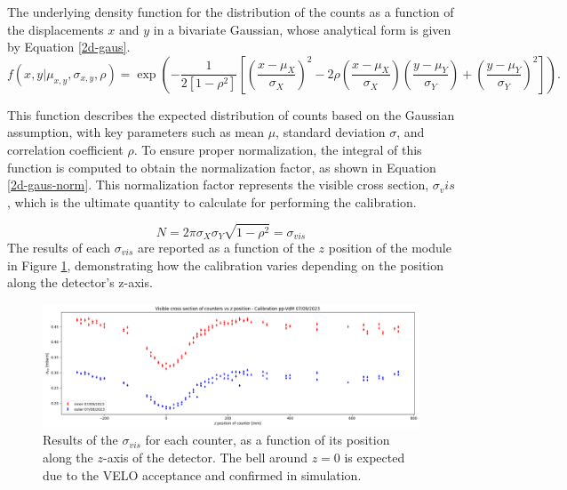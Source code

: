 The underlying density function for the distribution of the counts as a function of the displacements $x$ and $y$ in a bivariate Gaussian, whose analytical form is given by Equation \eqref{2d-gaus}. 
\begin{equation}
    f(x,y|\mu_{x,y},\sigma_{x,y},\rho)=\exp{\left(-{\frac {1}{2\left[1-\rho ^{2}\right]}}\left[\left({\frac {x-\mu _{X}}{\sigma _{X}}}\right)^{2}-2\rho \left({\frac {x-\mu _{X}}{\sigma _{X}}}\right)\left({\frac {y-\mu _{Y}}{\sigma _{Y}}}\right)+\left({\frac {y-\mu _{Y}}{\sigma _{Y}}}\right)^{2}\right]\right)}\label{2d-gaus}.
\end{equation}

This function describes the expected distribution of counts based on the Gaussian assumption, with key parameters such as mean $\mu$, standard deviation $\sigma$, and correlation coefficient $\rho$. To ensure proper normalization, the integral of this function is computed to obtain the normalization factor, as shown in Equation \eqref{2d-gaus-norm}. This normalization factor represents the visible cross section, $\sigma_vis$, which is the ultimate quantity to calculate for performing the calibration.

\begin{equation}
    N = 2\pi \sigma_{X}\sigma_{Y}\sqrt {1-\rho ^{2}}=\sigma_{vis}\label{2d-gaus-norm}
\end{equation}
 The results of each $\sigma_{vis}$ are reported as a function of the $z$ position of the module in Figure \ref{fig:coefficient_pos}, demonstrating how the calibration varies depending on the position along the detector's z-axis.

\begin{figure}
    \centering
    \includegraphics[width=\textwidth]{figures/coefficient_pos.png}
    \caption{Results of the $\sigma_{vis}$ for each counter, as a function of its position along the $z$-axis of the detector. The bell around $z=0$ is expected due to the VELO acceptance and confirmed in simulation.}
    \label{fig:coefficient_pos}
\end{figure}

